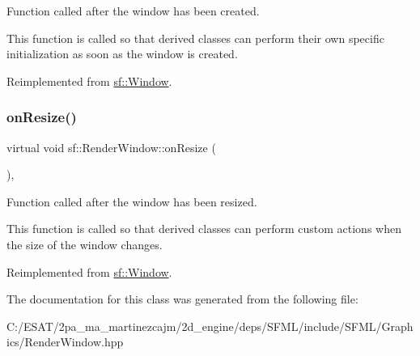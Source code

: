 Function called after the window has been created. 

This function is called so that derived classes can perform their own specific initialization as soon as the window is created. 

Reimplemented from \hyperlink{classsf_1_1_window_a106633b9be49b27f83d4712689b493eb}{sf\+::\+Window}.

\mbox{\label{classsf_1_1_render_window_a5c85fe482313562d33ffd24a194b6fef}} 
\subsubsection{\texorpdfstring{on\+Resize()}{onResize()}}
{\footnotesize\ttfamily virtual void sf\+::\+Render\+Window\+::on\+Resize (\begin{DoxyParamCaption}{ }\end{DoxyParamCaption})\hspace{0.3cm}{\ttfamily [protected]}, {\ttfamily [virtual]}}



Function called after the window has been resized. 

This function is called so that derived classes can perform custom actions when the size of the window changes. 

Reimplemented from \hyperlink{classsf_1_1_window_a10f567a387da7b49f417f73321fcf64d}{sf\+::\+Window}.



The documentation for this class was generated from the following file\+:\begin{DoxyCompactItemize}
\item 
C\+:/\+E\+S\+A\+T/2pa\+\_\+ma\+\_\+martinezcajm/2d\+\_\+engine/deps/\+S\+F\+M\+L/include/\+S\+F\+M\+L/\+Graphics/Render\+Window.\+hpp\end{DoxyCompactItemize}
